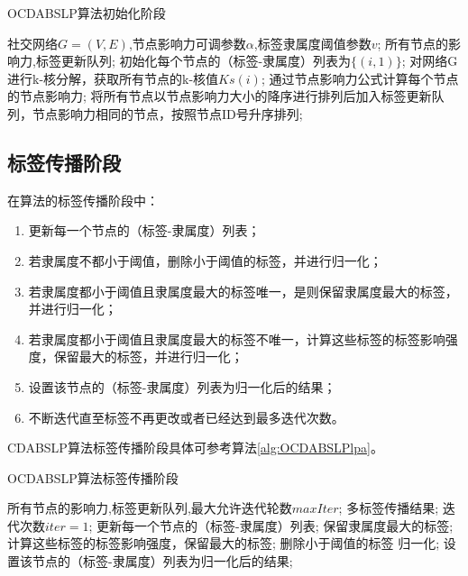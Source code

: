 \begin{algorithm}[h]  
  \caption{OCDABSLP算法初始化阶段}  
  \label{alg:OCDABSLPchushihua} 
  \begin{algorithmic}[1]  
    \Require  
      社交网络$G=(V,E)$,节点影响力可调参数$\alpha$,标签隶属度阈值参数$v$;  
    \Ensure  
      所有节点的影响力,标签更新队列;  
    \State 初始化每个节点的（标签-隶属度）列表为$ \{ (i,1) \} $;  
    \State 对网络G进行k-核分解，获取所有节点的k-核值$Ks(i)$; 
    \State 通过节点影响力公式计算每个节点的节点影响力; 
    \State 将所有节点以节点影响力大小的降序进行排列后加入标签更新队列，节点影响力相同的节点，按照节点ID号升序排列; 
  \end{algorithmic}  
\end{algorithm}  

\subsection{标签传播阶段}

在算法的标签传播阶段中：
\begin{enumerate}
  \item 更新每一个节点的（标签-隶属度）列表；
  \item 若隶属度不都小于阈值，删除小于阈值的标签，并进行归一化；
  \item 若隶属度都小于阈值且隶属度最大的标签唯一，是则保留隶属度最大的标签，并进行归一化；
  \item 若隶属度都小于阈值且隶属度最大的标签不唯一，计算这些标签的标签影响强度，保留最大的标签，并进行归一化；
  \item 设置该节点的（标签-隶属度）列表为归一化后的结果；
  \item 不断迭代直至标签不再更改或者已经达到最多迭代次数。
\end{enumerate}
CDABSLP算法标签传播阶段具体可参考算法\ref{alg:OCDABSLPlpa}。

\begin{algorithm}[h]  
  \caption{OCDABSLP算法标签传播阶段}  
  \label{alg:OCDABSLPlpa} 
  \begin{algorithmic}[1]  
    \Require  
      所有节点的影响力,标签更新队列,最大允许迭代轮数$maxIter$;  
    \Ensure  
      多标签传播结果;  
    \State 迭代次数$iter=1$;  
    \Repeat  
      \State 更新每一个节点的（标签-隶属度）列表;
          \State 保留隶属度最大的标签;  
        \Else  
          \State 计算这些标签的标签影响强度，保留最大的标签;
        \EndIf
      \Else  
        \State 删除小于阈值的标签
      \EndIf
      \State 归一化;
      \State 设置该节点的（标签-隶属度）列表为归一化后的结果;  
  \end{algorithmic}  
\end{algorithm}

